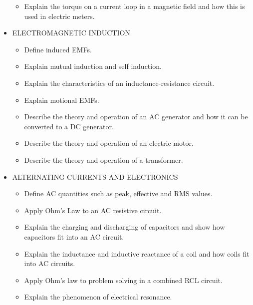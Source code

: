 \documentclass{article}
\begin{document}
\begin{itemize}
\begin{itemize}
\item Explain the torque on a current loop in a magnetic field and how this is used in electric meters.

\end{itemize}

\item ELECTROMAGNETIC INDUCTION
%
\begin{itemize}

\item Define induced EMFs.

\item Explain mutual induction and self induction.

\item Explain the characteristics of an inductance-resistance circuit.

\item Explain motional EMFs.

\item Describe the theory and operation of an AC generator and how it can be converted to a DC generator.

\item Describe the theory and operation of an electric motor.

\item Describe the theory and operation of a transformer.

\end{itemize}

\item ALTERNATING CURRENTS AND ELECTRONICS
%
\begin{itemize}

\item Define AC quantities such as peak, effective and RMS values.

\item Apply Ohm's Law to an AC resistive circuit.

\item Explain the charging and discharging of capacitors and show how capacitors fit into an AC circuit.

\item Explain the inductance and inductive reactance of a coil and how coils fit into AC circuits.

\item Apply Ohm's law to problem solving in a combined RCL circuit.

\item Explain the phenomenon of electrical resonance.


\end{itemize}
\end{itemize}
\end{document}
